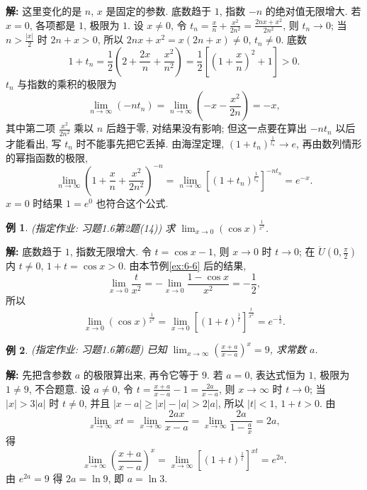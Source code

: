 \documentclass[UTF8,openany]{ctexbook}
\theoremstyle{chinesetextbook}
\newtheorem{example}{例}[section]
\newenvironment{cnsolution}{\par\indent\textbf{解:} \ignorespaces}{\par}
\begin{document}
\begin{cnsolution}
这里变化的是 $n$, $x$ 是固定的参数. 底数趋于 $1$, 指数 $-n$ 的绝对值无限增大. 若 $x=0$, 各项都是 $1$, 极限为 $1$. 设 $x\ne0$, 令 $\displaystyle t_n=\frac xn+\frac{x^2}{2n^2}=\frac{2nx+x^2}{2n^2}$, 则 $t_n\to0$; 当 $\displaystyle n>\frac{|x|}2$ 时 $2n+x>0$, 所以 $2nx+x^2=x(2n+x)\ne0$, $t_n\ne0$. 底数
\[
1+t_n=\frac12\left(2+\frac{2x}n+\frac{x^2}{n^2}\right)=\frac12\left[\left(1+\frac xn\right)^2+1\right]>0.
\]
$t_n$ 与指数的乘积的极限为
\[
\lim_{n\to\infty}(-nt_n)=\lim_{n\to\infty}\left(-x-\frac{x^2}{2n}\right)=-x,
\]
其中第二项 $\displaystyle\frac{x^2}{2n^2}$ 乘以 $n$ 后趋于零, 对结果没有影响; 但这一点要在算出 $-nt_n$ 以后才能看出, 写 $t_n$ 时不能事先把它丢掉. 由海涅定理, $\displaystyle(1+t_n)^{\frac1{t_n}}\to e$, 再由数列情形的幂指函数的极限,
\[
\lim_{n\to\infty}\left(1+\frac xn+\frac{x^2}{2n^2}\right)^{-n}=\lim_{n\to\infty}\left[(1+t_n)^{\frac1{t_n}}\right]^{-nt_n}=e^{-x}.
\]
$x=0$ 时结果 $1=e^0$ 也符合这个公式.
\end{cnsolution}
\begin{example}
\textnormal{(指定作业: 习题1.6第2题(14))} 求 $\displaystyle\lim_{x\to0}(\cos x)^{\frac1{x^2}}$.
\end{example}
\begin{cnsolution}
底数趋于 $1$, 指数无限增大. 令 $t=\cos x-1$, 则 $x\to0$ 时 $t\to0$; 在 $\displaystyle\mathring U\left(0,\frac\pi2\right)$ 内 $t\ne0$, $1+t=\cos x>0$. 由本节例\ref{ex:6-6} 后的结果,
\[
\lim_{x\to0}\frac t{x^2}=-\lim_{x\to0}\frac{1-\cos x}{x^2}=-\frac12,
\]
所以
\[
\lim_{x\to0}(\cos x)^{\frac1{x^2}}=\lim_{x\to0}\left[(1+t)^{\frac1t}\right]^{\frac t{x^2}}=e^{-\frac12}.
\]
\end{cnsolution}
\begin{example}
\textnormal{(指定作业: 习题1.6第6题)} 已知 $\displaystyle\lim_{x\to\infty}\left(\frac{x+a}{x-a}\right)^x=9$, 求常数 $a$.
\end{example}
\begin{cnsolution}
先把含参数 $a$ 的极限算出来, 再令它等于 $9$. 若 $a=0$, 表达式恒为 $1$, 极限为 $1\ne9$, 不合题意. 设 $a\ne0$, 令 $\displaystyle t=\frac{x+a}{x-a}-1=\frac{2a}{x-a}$, 则 $x\to\infty$ 时 $t\to0$; 当 $|x|>3|a|$ 时 $t\ne0$, 并且 $|x-a|\ge|x|-|a|>2|a|$, 所以 $|t|<1$, $1+t>0$. 由
\[
\lim_{x\to\infty}xt=\lim_{x\to\infty}\frac{2ax}{x-a}=\lim_{x\to\infty}\frac{2a}{1-\frac ax}=2a,
\]
得
\[
\lim_{x\to\infty}\left(\frac{x+a}{x-a}\right)^x=\lim_{x\to\infty}\left[(1+t)^{\frac1t}\right]^{xt}=e^{2a}.
\]
由 $e^{2a}=9$ 得 $2a=\ln9$, 即 $a=\ln3$.
\end{cnsolution}
\end{document}
